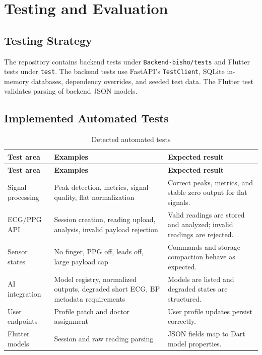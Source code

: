 \chapter{Testing and Evaluation}

\section{Testing Strategy}

The repository contains backend tests under \texttt{Backend-bisho/tests} and Flutter tests under \texttt{test}. The backend tests use FastAPI's \texttt{TestClient}, SQLite in-memory databases, dependency overrides, and seeded test data. The Flutter test validates parsing of backend JSON models.

\section{Implemented Automated Tests}

\begin{longtable}{p{} p{} p{}}
\caption{Detected automated tests}\\
\toprule
\textbf{Test area} & \textbf{Examples} & \textbf{Expected result}\\
\midrule
\endfirsthead
\toprule
\textbf{Test area} & \textbf{Examples} & \textbf{Expected result}\\
\midrule
\endhead
Signal processing & Peak detection, metrics, signal quality, flat normalization & Correct peaks, metrics, and stable zero output for flat signals.\\
ECG/PPG API & Session creation, reading upload, analysis, invalid payload rejection & Valid readings are stored and analyzed; invalid readings are rejected.\\
Sensor states & No finger, PPG off, leads off, large payload cap & Commands and storage compaction behave as expected.\\
AI integration & Model registry, normalized outputs, degraded short ECG, BP metadata requirements & Models are listed and degraded states are structured.\\
User endpoints & Profile patch and doctor assignment & User profile updates persist correctly.\\
Flutter models & Session and raw reading parsing & JSON fields map to Dart model properties.\\
\bottomrule
\end{longtable}


